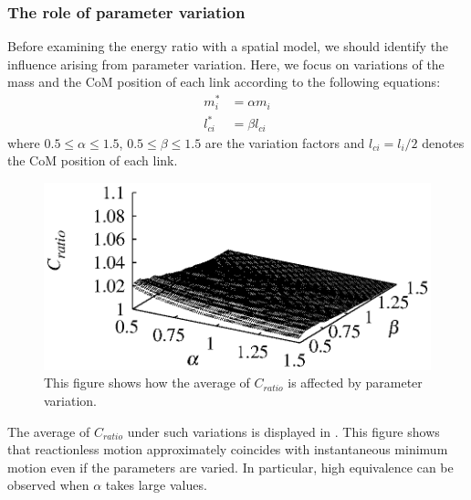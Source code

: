 \subsubsection{The role of parameter variation}
Before examining the energy ratio with a  spatial model,
we should identify the influence arising from parameter variation.
Here, we focus on variations of the mass and the CoM position of each link according 
to the following equations:
%
\begin{align}
  m_{i}^{*} &= \alpha m_{i}\\
  l^{*}_{ci} &= \beta l_{ci}
\end{align}
%
where  $0.5 \leq \alpha \leq 1.5$,
$0.5 \leq \beta \leq 1.5$  are the variation factors and 
$l_{ci} = l_{i}/2$ denotes  the CoM position of each link.
%
\begin{figure}[t]
  \centering
  \includegraphics[width=0.6\linewidth]{fig/chapter5/analysis/parameter.eps}
  \vspace{-2em}
  \caption{This figure shows how the average of $C_{ratio}$ is affected by parameter variation.}
  \label{fig:parameter}
\end{figure}
%
The average of $C_{ratio}$ under such variations is displayed in .
This figure shows that reactionless motion approximately coincides
with instantaneous minimum motion even if the parameters are varied.
In particular, high equivalence can be observed when $\alpha$ takes large values.

